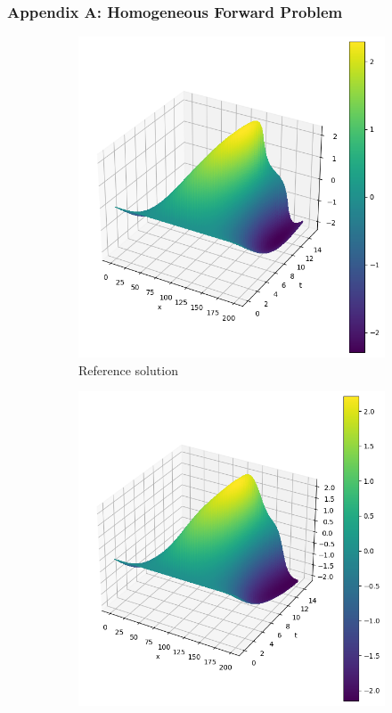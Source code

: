 \begin{frame}
    \frametitle{Appendix A: Homogeneous Forward Problem}

    \begin{figure}
        \centering
        \begin{subfigure}[b]{0.45\textwidth}
            \centering
            \includegraphics[width=\textwidth]{images/homogeneous_swe_pseudospectral_velocity.png}
            \caption{Reference solution}
            \label{fig:10_homogeneous_pseudospectral_swe_velocity}
        \end{subfigure}
        \hfill
        \begin{subfigure}[b]{0.45\textwidth}
            \centering
            \includegraphics[width=\textwidth]{images/homogeneous_swe_pinn_velocity.png}

\end{subfigure}
\end{figure}
\end{frame}

